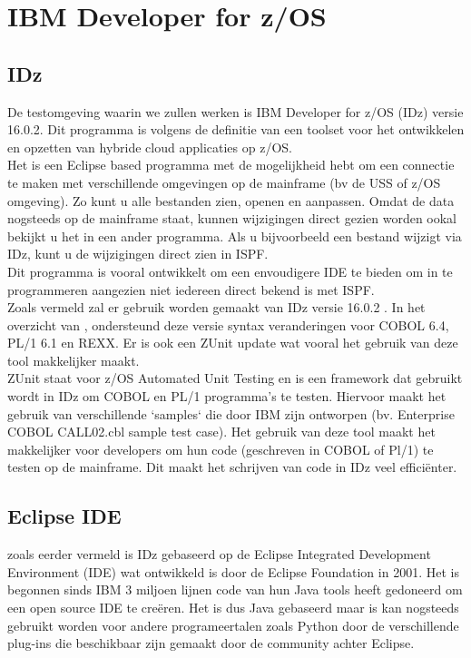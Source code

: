 \section{IBM Developer for z/OS}
\label{sec:IBM Developer for z/OS (IDz)}
\subsection{IDz}
De testomgeving waarin we zullen werken is IBM Developer for z/OS (IDz) versie 16.0.2. Dit programma is volgens de definitie van \textcite{Spohn2023} een toolset voor het ontwikkelen en opzetten van hybride cloud applicaties op z/OS. \\
Het is een Eclipse based programma met de mogelijkheid hebt om een connectie te maken met verschillende omgevingen op de mainframe (bv de USS of z/OS omgeving). Zo kunt u alle bestanden zien, openen en aanpassen. Omdat de data nogsteeds op de mainframe staat, kunnen wijzigingen direct gezien worden ookal bekijkt u het in een ander programma. Als u bijvoorbeeld een bestand wijzigt via IDz, kunt u de wijzigingen direct zien in ISPF. \\
Dit programma is vooral ontwikkelt om een envoudigere IDE te bieden om in te programmeren aangezien niet iedereen direct bekend is met ISPF. \\

Zoals vermeld zal er gebruik worden gemaakt van IDz versie 16.0.2 . In het overzicht van \textcite{IBM2024}, ondersteund deze versie syntax veranderingen voor COBOL 6.4, PL/1 6.1 en REXX. Er is ook een ZUnit update wat vooral het gebruik van deze tool makkelijker maakt. \\

ZUnit staat voor z/OS Automated Unit Testing en is een framework dat gebruikt wordt in IDz om COBOL en PL/1 programma's te testen. Hiervoor maakt het gebruik van verschillende `samples` die door IBM zijn ontworpen (bv. Enterprise COBOL CALL02.cbl sample test case). Het gebruik van deze tool maakt het makkelijker voor developers om hun code (geschreven in COBOL of Pl/1) te testen op de mainframe. Dit maakt het schrijven van code in IDz veel efficiënter. \autocite{IBM2024a}

\subsection{Eclipse IDE}
zoals eerder vermeld is IDz gebaseerd op de Eclipse Integrated Development Environment (IDE) wat ontwikkeld is door de Eclipse Foundation in 2001. Het is begonnen sinds IBM 3 miljoen lijnen code van hun Java tools heeft gedoneerd om een open source IDE te creëren. Het is dus Java gebaseerd maar is kan nogsteeds gebruikt worden voor andere programeertalen zoals Python door de verschillende plug-ins die beschikbaar zijn gemaakt door de community achter Eclipse. \autocite{Hanna2021} \\

